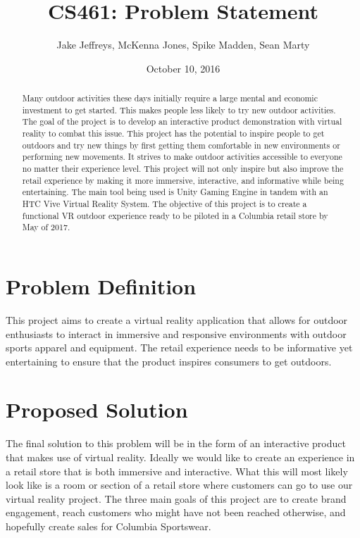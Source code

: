 \documentclass[10pt, oneside,onecolumn,draftclsnofoot]{IEEEtran}
\title{CS461: Problem Statement}
\author{Jake Jeffreys, McKenna Jones, Spike Madden, Sean Marty}
\date{October 10, 2016}
\begin{document}
\begin{titlepage}
\maketitle
\vspace{3cm}
\begin{abstract}
Many outdoor activities these days initially require a large mental and economic
investment to get started. This makes people less likely to try new outdoor
activities. The goal of the project is to develop an interactive product
demonstration with virtual reality to combat this issue. This project has the
potential to inspire people to get outdoors and try new things by first getting
them comfortable in new environments or performing new movements. It strives to
make outdoor activities accessible to everyone no matter their experience level.
This project will not only inspire but also improve the retail experience by
making it more immersive, interactive, and informative while being
entertaining. The main tool being used is Unity Gaming Engine in tandem with an
HTC Vive Virtual Reality System. The objective of this project is to create a
functional VR outdoor experience ready to be piloted in a Columbia retail store by
May of 2017.
\end{abstract}
\end{titlepage}

\section{Problem Definition}
This project aims to create a virtual reality application that allows for
outdoor enthusiasts to interact in immersive and responsive environments with
outdoor sports apparel and equipment. The retail experience needs to be
informative yet entertaining to ensure that the product inspires consumers to
get outdoors.


\section{Proposed Solution}

The final solution to this problem will be in the form of an interactive
product that makes use of virtual reality. Ideally we would like to create an
experience in a retail store that is both immersive and interactive. What this
will most likely look like is a room or section of a retail store where
customers can go to use our virtual reality project. The three main goals of
this project are to create brand engagement, reach customers who might have not
been reached otherwise, and hopefully create sales for Columbia Sportswear.
\end{document}
